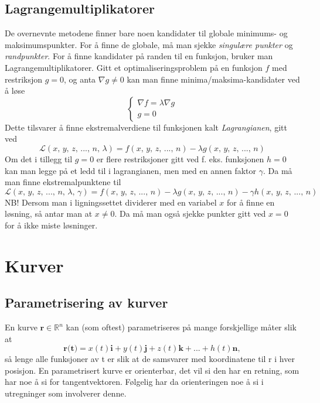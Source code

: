 \documentclass[fleqn,12pt]{wlscirep}
\begin{document}
\subsection{Lagrangemultiplikatorer}
De overnevnte metodene finner bare noen kandidater til globale minimums- og maksimumspunkter. For å finne de globale, må man sjekke \textit{singulære punkter} og \textit{randpunkter}. For å finne kandidater på randen til en funksjon, bruker man Lagrangemultiplikatorer. Gitt et optimaliseringsproblem på en funksjon $f$ med restriksjon $g = 0$, og anta $\nabla g \neq 0$ kan man finne minima/maksima-kandidater ved å løse 
\begin{equation}
    \begin{cases}
    \nabla f = \lambda \nabla g \\
    g = 0
    \end{cases}
\end{equation}
Dette tilsvarer å finne ekstremalverdiene til funksjonen kalt \textit{Lagrangianen}, gitt ved \begin{equation}
    \mathcal{L}(x,\,y,\,z,\,...,\,n,\,\lambda) = f(x,\, y,\, z,\, ...,\,n) -\lambda g(x,\, y,\, z,\, ...,\,n) 
\end{equation}
Om det i tillegg til $g = 0$ er flere restriksjoner gitt ved f. eks. funksjonen $h = 0$ kan man legge på et ledd til i lagrangianen, men med en annen faktor $\gamma$. Da må man finne ekstremalpunktene til 
\begin{equation}
    \mathcal{L}(x,\,y,\,z,\,...,\,n,\,\lambda,\,\gamma) = f(x,\, y,\, z,\, ...,\,n) -\lambda g(x,\, y,\, z,\, ...,\,n) -\gamma h(x,\, y,\, z,\, ...,\,n)
\end{equation}
NB! Dersom man i ligningssettet dividerer med en variabel $x$ for å finne en løsning, så antar man at $x\neq 0$. Da må man også sjekke punkter gitt ved $x = 0$ for å ikke miste løsninger.
\section{Kurver}
\subsection{Parametrisering av kurver}
En kurve $\textbf{r} \in \mathbb{R}^n$ kan (som oftest) parametriseres på mange forskjellige måter slik at 
\begin{equation}
 \textbf{r(t)} = x(t)\textbf{i} + y(t)\textbf{j} + z(t)\textbf{k} + ... + h(t)\textbf{n},
\end{equation}
så lenge alle funksjoner av t er slik at de samsvarer med koordinatene til r i hver posisjon.
En parametrisert kurve er orienterbar, det vil si den har en retning, som har noe å si for tangentvektoren. Følgelig har da orienteringen noe å si i utregninger som involverer denne. 
\end{document}
